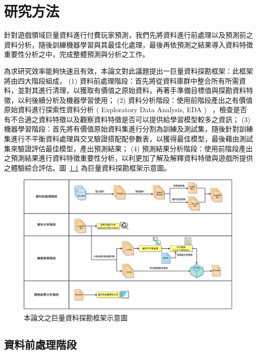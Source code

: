 \chapter{研究方法}
\label{cha:Method}

針對遊戲領域巨量資料進行付費玩家預測，我們先將資料進行前處理以及預測前之資料分析，隨後訓練機器學習與其最佳化處理，最後再依預測之結果導入資料特徵重要性分析之中，完成整體預測與分析之工作。

為求研究效率能夠快速且有效，本論文對此議題提出一巨量資料探勘框架：此框架將由四大階段組成， (1) 資料前處理階段：首先將從資料庫群中整合所有所需資料，並對其進行清理，以獲取有價值之原始資料，再著手準備目標值與探勘資料特徵，以利後續分析及機器學習使用； (2) 資料分析階段：使用前階段產出之有價值原始資料進行探索性資料分析 ( Exploratory Data Analysis, EDA ) ~\cite{tukey1977exploratory}，檢查是否有不合適之資料特徵以及觀察資料特徵是否可以提供給學習模型較多之資訊； (3) 機器學習階段：首先將有價值原始資料集進行分割為訓練及測試集，隨後針對訓練集進行不平衡資料處理與交叉驗證搭配配參數表，以獲得最佳模型，最後藉由測試集來驗證評估最佳模型，產出預測結果； (4) 預測結果分析階段：使用前階段產出之預測結果進行資料特徵重要性分析，以利更加了解及解釋資料特徵與遊戲所提供之體驗綜合評估。圖~\ref{fig:Image_Framework} 為巨量資料探勘框架示意圖。

\begin{figure}[!htb]
  \begin{center}
    \includegraphics[width=1\textwidth]{figures/Image_Framework.png}
    \caption[本論文之巨量資料探勘框架示意圖]{本論文之巨量資料探勘框架示意圖}
    \label{fig:Image_Framework}
  \end{center}
\end{figure}
\newpage

\section{資料前處理階段}

